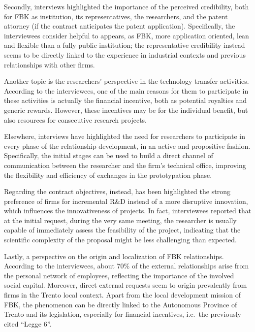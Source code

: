 Secondly, interviews highlighted the importance of the perceived credibility, both for FBK as institution, its representatives, the researchers, and the patent attorney (if the contract anticipates the patent application). Specifically, the interviewees consider helpful to appears, as FBK, more application oriented, lean and flexible than a fully public institution; the representative credibility instead seems to be directly linked to the experience in industrial contexts and previous relationships with other firms. 

Another topic is the researchers’ perspective in the technology transfer activities. According to the interviewees, one of the main reasons for them to participate in these activities is actually the financial incentive, both as potential royalties and generic rewards. However, these incentives may be for the individual benefit, but also resources for consecutive research projects.  

Elsewhere, interviews have highlighted the need for researchers to participate in every phase of the relationship development, in an active and propositive fashion. Specifically, the initial stages can be used to build a direct channel of communication between the researcher and the firm's technical office, improving the flexibility and efficiency of exchanges in the prototypation phase.

Regarding the contract objectives, instead, has been highlighted the strong preference of firms for incremental R\&D instead of a more disruptive innovation, which influences the innovativeness of projects. In fact, interviewees reported that at the initial request, during the very same meeting, the researcher is usually capable of immediately assess the feasibility of the project, indicating that the scientific complexity of the proposal might be less challenging than expected.

Lastly, a perspective on the origin and localization of FBK relationships. According to the interviewees, about 70\% of the external relationships arise from the personal network of employees, reflecting the importance of the involved social capital. Moreover, direct external requests seem to origin prevalently from firms in the Trento local context. Apart from the local development mission of FBK, the phenomenon can be directly linked to the Autonomous Province of Trento and its legislation, especially for financial incentives, i.e.\ the previously cited \enquote{Legge 6}.

